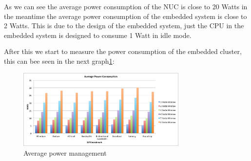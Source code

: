 \begin{table}[]
    \centering
    \caption{NUC D54250WYK power consumption during MPI bench}
    \label{NUC_power_1}
\end{table}


As we can see the average power consumption of the NUC is close to 20 Watts in
the meantime the average power consumption of the embedded system is close to
2 Watts. This is due to the design of the embedded system, just the CPU in the
embedded system is designed to consume 1 Watt in idle mode.

After this we start to measure the power consumption of the embedded cluster,
this can bee seen in the next graph\ref{power_average_minnow}: 

\begin{figure}[H]
\centering
\includegraphics[width=0.75\textwidth]{images/power_average.png}
\caption{Average power management}
\label{power_average_minnow}
\end{figure}


